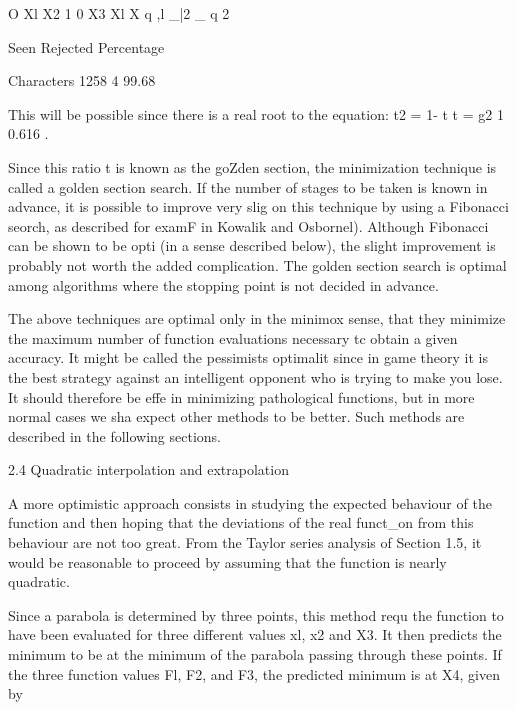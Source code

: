  
 
 
 
 
 
 
 
 
 
O         Xl     X2        1        0     X3 Xl     X
                                 q                  ,l _|2 _ q
                                             2
 
                 Seen Rejected  Percentage
 
Characters       1258        4   99.68
 
 
This will be possible since there is a real root to the equation:
                                  t2 = 1- t
                                  t  = g2 1  0.616 .
 
 
Since this ratio t is known as the goZden section, the minimization
technique is called a golden section search.  If the number of stages
to be taken is known in advance, it is possible to improve very slig
on this technique by using a Fibonacci seorch, as described for examF
in Kowalik and Osbornel).  Although Fibonacci can be shown to be opti
(in a sense described below), the slight improvement is probably not
worth the added complication.  The golden section search is optimal
among algorithms where the stopping point is not decided in advance.
 
     The above techniques are optimal only in the minimox sense, that
they minimize the maximum number of function evaluations necessary tc
obtain a given accuracy.  It might be called the pessimists optimalit
since in game theory it is the best strategy against an intelligent
opponent who is trying to make you lose.  It should therefore be effe
in minimizing pathological functions, but in more normal cases we sha
expect other methods to be better.  Such methods are described in the
following sections.
 
 
2.4  Quadratic interpolation and extrapolation
 
     A more optimistic approach consists in studying the expected
behaviour of the function and then hoping that the deviations of the
real funct_on from this behaviour are not too great.  From the Taylor
series analysis of Section 1.5, it would be reasonable to proceed by
assuming that the function is nearly quadratic.
 
     Since a parabola is determined by three points, this method requ
the function to have been evaluated for three different values xl, x2
and X3.  It then predicts the minimum to be at the minimum of the
parabola passing through these points.  If the three function values
Fl, F2, and F3, the predicted minimum is at X4, given by
 
